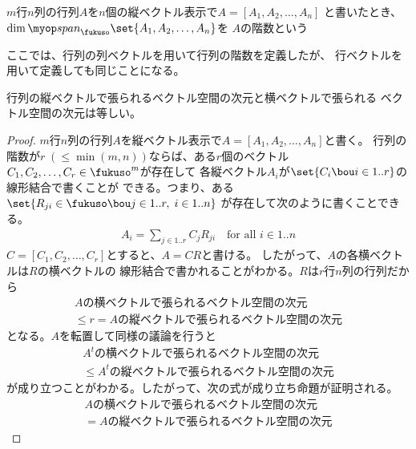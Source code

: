 	\begin{definition}[行列の階数]\label{def:行列の階数} %
		$m$行$n$列の行列$A$を$n$個の縦ベクトル表示で$A=[A_1,A_2,\dots,A_n]$
		と書いたとき、$\dim\spanall_\fukuso\set{A_1,A_2,\dots,A_n}$を
		$A$の階数という
	\end{definition} %

	ここでは、行列の列ベクトルを用いて行列の階数を定義したが、
	行ベクトルを用いて定義しても同じことになる。

	\begin{proposition}[行列の階数]\label{prop:行列の階数} %
		行列の縦ベクトルで張られるベクトル空間の次元と横ベクトルで張られる
		ベクトル空間の次元は等しい。
	\end{proposition} %
	\begin{proof} %
		$m$行$n$列の行列$A$を縦ベクトル表示で$A=[A_1,A_2,\dots,A_n]$と書く。
		行列の階数が$r\;(\le \min(m,n))$ならば、ある$r$個のベクトル
		$C_1,C_2,\dots,C_r\in\fukuso^m$が存在して
		各縦ベクトル$A_i$が$\set{C_i\bou i\in1..r}$の線形結合で書くことが
		できる。つまり、ある$\set{R_{ji}\in\fukuso\bou j\in1..r,\;i\in1..n}$
		が存在して次のように書くことできる。
		\begin{equation*}\begin{split} %
			A_i = \sum_{j\in1..r}C_jR_{ji} \quad\text{for all }i\in1..n
		\end{split}\end{equation*} %
		$C=[C_1,C_2,\dots,C_r]$とすると、$A=CR$と書ける。
		したがって、$A$の各横ベクトルは$R$の横ベクトルの
		線形結合で書かれることがわかる。$R$は$r$行$n$列の行列だから
		\begin{equation*}\begin{split} %
			\text{$A$の横ベクトルで張られるベクトル空間の次元} \\
			\le r = \text{$A$の縦ベクトルで張られるベクトル空間の次元}
		\end{split}\end{equation*} %
		となる。$A$を転置して同様の議論を行うと
		\begin{equation*}\begin{split} %
			\text{$A^t$の横ベクトルで張られるベクトル空間の次元} \\
			\le \text{$A^t$の縦ベクトルで張られるベクトル空間の次元}
		\end{split}\end{equation*} %
		が成り立つことがわかる。したがって、次の式が成り立ち命題が証明される。
		\begin{equation*}\begin{split} %
			\text{$A$の横ベクトルで張られるベクトル空間の次元} \\
			= \text{$A$の縦ベクトルで張られるベクトル空間の次元}
		\end{split}\end{equation*} %
	\end{proof} %

